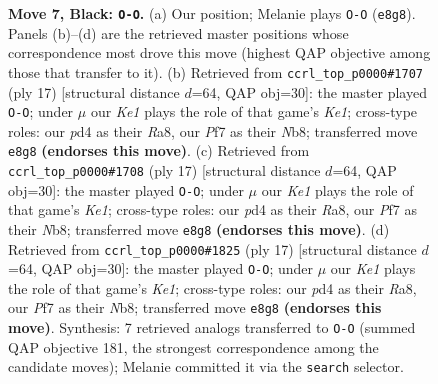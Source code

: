\documentclass[11pt]{article}
\begin{document}
\begin{figure}[p]
\caption{\textbf{Move 7, Black: \texttt{O-O}.} (a) Our position; Melanie plays \texttt{O-O} (\texttt{e8g8}). Panels (b)--(d) are the retrieved master positions whose correspondence most drove this move (highest QAP objective among those that transfer to it). (b) Retrieved from \texttt{ccrl\_top\_p0000\#1707} (ply 17) [structural distance $d$=64, QAP obj=30]: the master played \texttt{O-O}; under $\mu$ our \emph{Ke1} plays the role of that game's \emph{Ke1}; cross-type roles: our \emph{p}d4 as their \emph{R}a8, our \emph{P}f7 as their \emph{N}b8; transferred move \texttt{e8g8} \textbf{(endorses this move)}. (c) Retrieved from \texttt{ccrl\_top\_p0000\#1708} (ply 17) [structural distance $d$=64, QAP obj=30]: the master played \texttt{O-O}; under $\mu$ our \emph{Ke1} plays the role of that game's \emph{Ke1}; cross-type roles: our \emph{p}d4 as their \emph{R}a8, our \emph{P}f7 as their \emph{N}b8; transferred move \texttt{e8g8} \textbf{(endorses this move)}. (d) Retrieved from \texttt{ccrl\_top\_p0000\#1825} (ply 17) [structural distance $d$=64, QAP obj=30]: the master played \texttt{O-O}; under $\mu$ our \emph{Ke1} plays the role of that game's \emph{Ke1}; cross-type roles: our \emph{p}d4 as their \emph{R}a8, our \emph{P}f7 as their \emph{N}b8; transferred move \texttt{e8g8} \textbf{(endorses this move)}. Synthesis: 7 retrieved analogs transferred to \texttt{O-O} (summed QAP objective 181, the strongest correspondence among the candidate moves); Melanie committed it via the \texttt{search} selector.}
\label{fig:thought-m13}
\end{figure}

\clearpage
\end{document}
